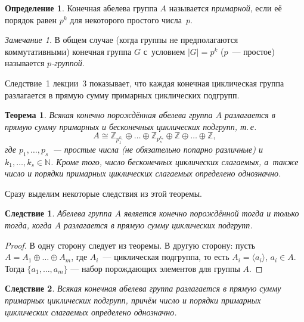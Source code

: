 \documentclass[a4paper,10pt]{amsart}
\def\ZZ{{\mathbb Z}}%
\def\NN{{\mathbb N}}%
\newtheorem{theorem}{Теорема}
\newtheorem{corollary}{Следствие}
\theoremstyle{definition}
\newtheorem{definition}{Определение}
\theoremstyle{remark}
\newtheorem{remark}{Замечание}
\begin{document}
\begin{definition}
Конечная абелева группа $A$ называется {\it примарной}, если её
порядок равен $p^k$ для некоторого простого числа~$p$.
\end{definition}

\begin{remark}
В общем случае (когда группы не предполагаются коммутативными)
конечная группа $G$ с~условием $|G| = p^k$ ($p$~--- простое)
называется {\it $p$-группой}.
\end{remark}

Следствие~1 лекции~3 показывает, что каждая конечная циклическая
группа разлагается в прямую сумму примарных циклических подгрупп.

\begin{theorem} \label{traz}
Всякая конечно порождённая абелева группа $A$ разлагается в прямую
сумму примарных и бесконечных циклических подгрупп, т.\,е.
\begin{equation} \label{eqn}
A \cong \ZZ_{p_1^{k_1}} \oplus \ldots \oplus \ZZ_{p_s^{k_s}} \oplus
\ZZ \oplus \ldots \oplus \ZZ,
\end{equation}
где $p_1, \ldots, p_s$~--- простые числа \textup(не обязательно
попарно различные\textup) и $k_1, \ldots, k_s \in \NN$. Кроме того,
число бесконечных циклических слагаемых, а~также число и порядки
примарных циклических слагаемых определено однозначно.
\end{theorem}

Сразу выделим некоторые следствия из этой теоремы.

\begin{corollary}
Абелева группа $A$ является конечно порождённой тогда и только тогда, когда $A$ разлагается в прямую сумму циклических подгрупп. 
\end{corollary}

\begin{proof}
В одну сторону следует из теоремы. В другую сторону: пусть $A = A_1 \oplus \ldots \oplus A_m$, где $A_i$~--- циклическая подгруппа, то есть $A_i = \langle a_i \rangle$, $a_i \in A$. Тогда $\{a_1, \ldots, a_m \}$ --- набор порождающих элементов для группы $A$.
\end{proof}

\begin{corollary}
Всякая конечная абелева группа разлагается в прямую сумму примарных
циклических подгрупп, причём число и порядки примарных циклических
слагаемых определено однозначно.
\end{corollary}
\end{document}
